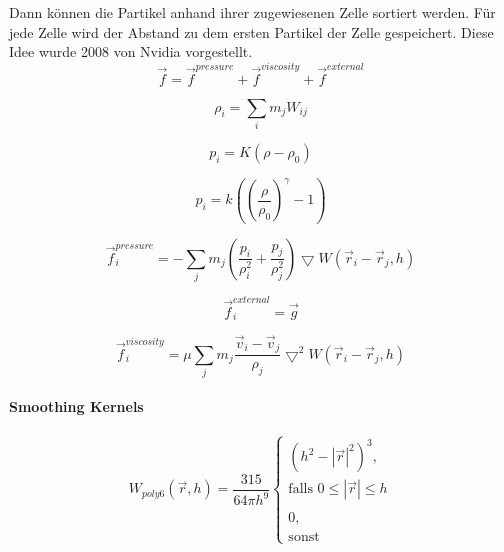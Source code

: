 \documentclass[a4paper]{paper}
\begin{document}
Dann können die Partikel anhand ihrer zugewiesenen Zelle sortiert werden. Für jede Zelle wird der Abstand zu dem ersten Partikel der Zelle gespeichert. Diese Idee wurde 2008 von Nvidia vorgestellt. \citep{Nvidia}
\begin{equation}
\label{force}
\vec{f} = \vec{f}^{pressure} + \vec{f}^{viscosity} + \vec{f}^{external}
\end{equation}


\begin{equation}
\label{density}
\rho_i = \sum_i{m_j W_{ij}}
\end{equation}



\begin{equation}
\label{pressure}
p_i=K(\rho-\rho_0)
\end{equation}

\begin{equation}
\label{pressure_tait}
p_i = k((\frac{\rho}{\rho_{0}})^{\gamma}-1)
\end{equation}

\begin{equation}
\label{force_pressure}
\vec{f}^{pressure}_{i} = - \sum_{j}m_{j}(\frac{p_{i}}{\rho_{i}^2} +\frac{p_{j}}{\rho_{j}^2})\bigtriangledown W(\vec{r}_{i}-\vec{r}_{j},h)
\end{equation}

\begin{equation}
\label{force_external}
\vec{f}^{external}_{i} = \vec{g}
\end{equation}

\begin{equation}
\label{force_viscosity}
\vec{f}^{viscosity}_{i} = \mu \sum_{j}m_{j}\frac{\vec{v}_{i} - \vec{v}_{j}}{\rho_{j}}\bigtriangledown^2 W(\vec{r}_{i}-\vec{r}_{j},h)
\end{equation}

\paragraph{Smoothing Kernels}

\begin{equation}
\label{poly6}
W_{poly6}(\vec{r},h) = \frac{315}{64 \pi h^9} 
\begin{cases}
(h^2-|\vec{r}|^2)^3, \\ \text{falls } 0 \leq |\vec{r}| \leq h \\
\\
0, \\ \text{sonst}
\end{cases}
\end{equation}
\end{document}
